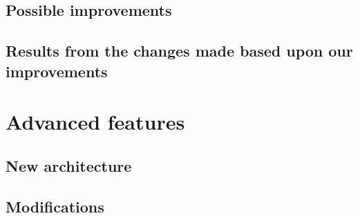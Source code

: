\documentclass[12pt, a4paper]{article}
\begin{document}
\subsection{Possible improvements}
\subsection{Results from the changes made based upon our improvements}



\section{Advanced features}

\subsection{New architecture}
\subsection{Modifications}
\end{document}
